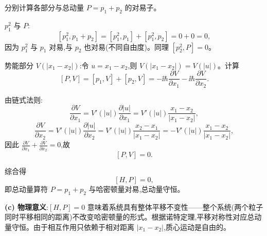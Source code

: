 \begin{question}
\begin{solution}
	分别计算各部分与总动量 $P=p_1+p_2$ 的对易子。

	$p_1^2$ 与 $P$:
	\[
	[p_1^2,p_1+p_2]=[p_1^2,p_1]+[p_1^2,p_2]=0+0=0,
	\]
	因为 $p_1^2$ 与 $p_1$ 对易,与 $p_2$ 也对易(不同自由度)。同理 $[p_2^2,P]=0$。

	势能部分 $V(|x_1-x_2|)$:令 $u=x_1-x_2$,则 $V(|x_1-x_2|)=V(|u|)$。计算
	\[
	[P,V]=[p_1,V]+[p_2,V]=-\ii\hbar\frac{\partial V}{\partial x_1}-\ii\hbar\frac{\partial V}{\partial x_2}.
	\]

	由链式法则:
	\[
	\frac{\partial V}{\partial x_1}=V'(|u|)\frac{\partial |u|}{\partial x_1}=V'(|u|)\frac{x_1-x_2}{|x_1-x_2|},
	\]
	\[
	\frac{\partial V}{\partial x_2}=V'(|u|)\frac{\partial |u|}{\partial x_2}=V'(|u|)\frac{x_2-x_1}{|x_1-x_2|}=-V'(|u|)\frac{x_1-x_2}{|x_1-x_2|},
	\]
	因此 $\frac{\partial V}{\partial x_1}+\frac{\partial V}{\partial x_2}=0$,故
	\[
	[P,V]=0.
	\]

	综合得
	\[
	[H,P]=0,
	\]
	即总动量算符 $P=p_1+p_2$ 与哈密顿量对易,总动量守恒。

	\textbf{(c) 物理意义}:$[H,P]=0$ 意味着系统具有整体平移不变性——整个系统(两个粒子同时平移相同的距离)不改变哈密顿量的形式。根据诺特定理,平移对称性对应总动量守恒。由于相互作用只依赖于相对距离 $|x_1-x_2|$,质心运动是自由的。
	\end{solution}
\end{question}

